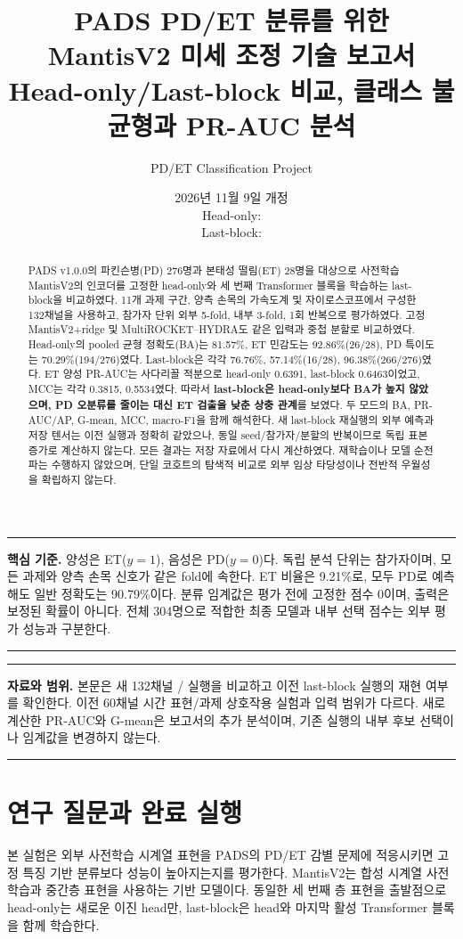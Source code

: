 \documentclass[11pt,a4paper]{article}
\title{\color{navy}\bfseries PADS PD/ET 분류를 위한\\[.3em]
 MantisV2 미세 조정 기술 보고서\\[.6em]
 \large Head-only/Last-block 비교, 클래스 불균형과 PR-AUC 분석}
\author{PD/ET Classification Project}
\date{2026년 11월 9일 개정\\[.25em]\small Head-only: \code{@@HEAD_ONLY_RUN_ID@@}\\
 Last-block: \code{@@RUN_ID@@}}
\newcommand{\code}[1]{\texttt{\detokenize{#1}}}
\newenvironment{keybox}{\begin{center}\begin{minipage}{.94\linewidth}\color{navy}\hrule\vspace{.6em}\small}
 {\vspace{.5em}\hrule\end{minipage}\end{center}}
\begin{document}
\maketitle\thispagestyle{empty}
\begin{abstract}
PADS v1.0.0의 파킨슨병(PD) 276명과 본태성 떨림(ET) 28명을 대상으로
사전학습 MantisV2의 인코더를 고정한 head-only와 세 번째 Transformer 블록을
학습하는 last-block을 비교하였다.
11개 과제 구간, 양측 손목의 가속도계 및 자이로스코프에서 구성한 132채널을 사용하고,
참가자 단위 외부 5-fold, 내부 3-fold, 1회 반복으로 평가하였다.
고정 MantisV2+ridge 및 MultiROCKET--HYDRA도 같은 입력과 중첩 분할로 비교하였다.
Head-only의 pooled 균형 정확도(BA)는 81.57\%, ET 민감도는 92.86\%(26/28),
PD 특이도는 70.29\%(194/276)였다. Last-block은 각각
76.76\%, 57.14\%(16/28), 96.38\%(266/276)였다.
ET 양성 PR-AUC는 사다리꼴 적분으로 head-only 0.6391, last-block 0.6463이었고,
MCC는 각각 0.3815, 0.5534였다.
따라서 \textbf{last-block은 head-only보다 BA가 높지 않았으며,
PD 오분류를 줄이는 대신 ET 검출을 낮춘 상충 관계}를 보였다.
두 모드의 BA, PR-AUC/AP, G-mean, MCC, macro-F1을 함께 해석한다.
새 last-block 재실행의 외부 예측과 저장 텐서는 이전 실행과 정확히 같았으나,
동일 seed/참가자/분할의 반복이므로 독립 표본 증가로 계산하지 않는다.
모든 결과는 저장 자료에서 다시 계산하였다. 재학습이나 모델 순전파는 수행하지 않았으며,
단일 코호트의 탐색적 비교로 외부 임상 타당성이나 전반적 우월성을 확립하지 않는다.
\end{abstract}
\begin{keybox}
\textbf{핵심 기준.} 양성은 ET($y=1$), 음성은 PD($y=0$)다.
독립 분석 단위는 참가자이며, 모든 과제와 양측 손목 신호가 같은 fold에 속한다.
ET 비율은 9.21\%로, 모두 PD로 예측해도 일반 정확도는 90.79\%이다.
분류 임계값은 평가 전에 고정한 점수 0이며, 출력은 보정된 확률이 아니다.
전체 304명으로 적합한 최종 모델과 내부 선택 점수는 외부 평가 성능과 구분한다.
\end{keybox}
\clearpage
\tableofcontents
\vfill
\begin{keybox}
\textbf{자료와 범위.} 본문은 새 132채널 \code{head-only}/\code{last-block} 실행을 비교하고
이전 last-block 실행의 재현 여부를 확인한다.
이전 60채널 시간 표현/과제 상호작용 실험과 입력 범위가 다르다.
새로 계산한 PR-AUC와 G-mean은 보고서의 추가 분석이며,
기존 실행의 내부 후보 선택이나 임계값을 변경하지 않는다.
\end{keybox}
\clearpage

\section{연구 질문과 완료 실행}
본 실험은 외부 사전학습 시계열 표현을 PADS의 PD/ET 감별 문제에 적응시키면
고정 특징 기반 분류보다 성능이 높아지는지를 평가한다.
MantisV2는 합성 시계열 사전학습과 중간층 표현을 사용하는 기반 모델이다\cite{mantis}.
동일한 세 번째 층 표현을 출발점으로 head-only는 새로운 이진 head만,
last-block은 head와 마지막 활성 Transformer 블록을 함께 학습한다.
\end{document}
